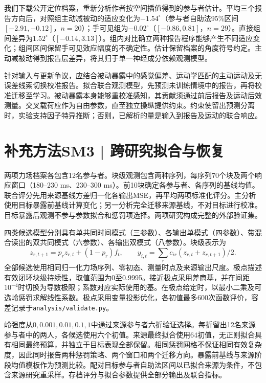 \documentclass[11pt,a4paper]{article}
\begin{document}
我们下载公开定位档案，重新分析作者按空间插值得到的参与者估计。平均三个报告方向后，对照组主动减被动的适应变化为$-1.54^\circ$（参与者自助法95\%区间$[-2.91,-0.12]$，$n=20$）；手可见组为$-0.02^\circ$（$[-0.86,0.81]$，$n=29$）。直接组间差异为$1.52^\circ$（$[-0.14,3.13]$）。组内对比确立两种报告程序能够产生不同适应变化；组间区间保留手可见效应幅度的不确定性。估计保留档案的角度符号约定。主动减被动得到报告层差异，将其归于单一神经成分依赖观测模型。\cite{external2020}

针对输入与更新争议，应结合被动暴露中的感觉偏差、运动学匹配的主动运动及无误差线索切换校准报告。拟合联合观测模型，先预测未训练情境中的报告，再将校准迁移至学习。被动暴露本身能够重校准感知，其贡献须通过前后报告及运动后效测量。交叉载荷应作为自由参数，直至独立操纵提供约束。约束使留出预测分离时，实验支持因子特异推断；否则，已解析的量是输入到报告及运动的联合响应。

\clearpage\section{补充方法SM3 | 跨研究拟合与恢复}

两项力场档案各包含12名参与者。块级观测包含两种序列，每序列70个块及两个响应窗口（180--230 ms、230--300 ms）。前10块确定各参与者、各序列的基线均值。联合评分先用来源基线方差归一化各输出MSE，再平均两项标准化评分。主分析使用目标暴露前基线计算变化；另一分析完全迁移来源基线，不对目标进行校准。目标暴露后观测不参与参数拟合和惩罚项选择。两项研究构成完整的外部验证集。\cite{franklin2021,franklin2023}

四类候选模型分别具有单共同时间模式（三参数）、各输出单模式（四参数）、带混合读出的双共同模式（六参数）、各输出双模式（八参数）。块级表示为
\begin{equation}z_{r,t+1}=p_rz_{r,t}+(1-p_r)f_t,\qquad y_{i,t}=\sum_r c_{ir}(z_{r,t}+z_{r,t+1})/2.\end{equation}
全部候选使用相同归一化力场序列、零初态、测量时点及来源输出尺度。极点描述有效闭环块级持续性，取值范围为0至0.9995。接近极点采用差商基，并在间距$10^{-4}$时切换为导数极限；系数对应实际使用的基。在极点给定时，以最小二乘及可选岭惩罚求解线性系数。极点采用变量投影优化，各初值最多600次函数评价，容差记录于\texttt{analysis/validate.py}。

岭强度从$0,0.001,0.01,0.1,1$中通过来源参与者六折验证选择。每折留出12名来源参与者中的两人，各候选使用六个初值。来源最终拟合使用64初值，无正则拟合具有相同最终预算，并独立于目标表现全部保留。相同惩罚网格不保证相同有效复杂度，因此同时报告两种惩罚策略、两个窗口和两个迁移方向。暴露前基线与来源阶段均值模板作为预测比较。配对目标参与者自助法区间以已拟合来源为条件，不包含来源研究重采样。存档评分与拟合参数提供全部分输出及联合指标。
\end{document}
